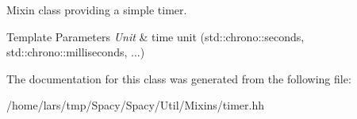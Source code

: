 Mixin class providing a simple timer. 


\begin{DoxyTemplParams}{Template Parameters}
{\em Unit} & time unit (std\+::chrono\+::seconds, std\+::chrono\+::milliseconds, ...) \\
\hline
\end{DoxyTemplParams}


The documentation for this class was generated from the following file\+:\begin{DoxyCompactItemize}
\item 
/home/lars/tmp/\+Spacy/\+Spacy/\+Util/\+Mixins/timer.\+hh\end{DoxyCompactItemize}
